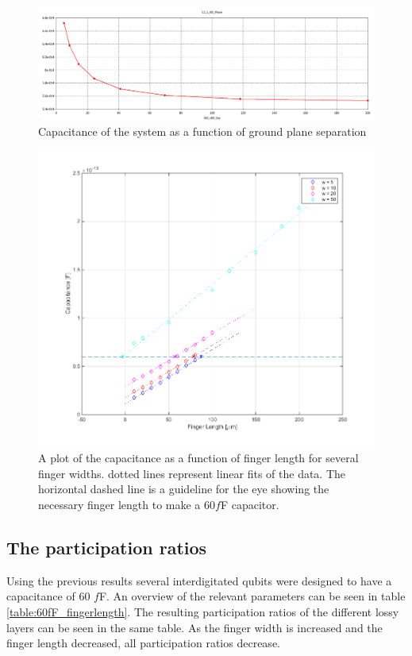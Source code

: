  

\begin{figure}
	\centering
	\includegraphics[width = \textwidth]{Figures/capacitance_vs_slotsize}
	\caption{Capacitance of the system as a function of ground plane separation}
	\label{fig:capacitance_vs_slotsize}
\end{figure}

\begin{figure}
	\centering
	\includegraphics[width = \textwidth]{Figures/Capacitances_g5_50}
	\caption{A plot of the capacitance as a function of finger length for several finger widths. dotted lines represent linear fits of the data. The horizontal dashed line is a guideline for the eye showing the necessary finger length to make a 60\(f\)F capacitor.}
	\label{fig:Capacitances_g5_50}
\end{figure}

\subsection{The participation ratios}
Using the previous results several interdigitated qubits were designed to have a capacitance of 60 \(f\)F. An overview of the relevant parameters can be seen in table \ref{table:60fF_fingerlength}. The resulting participation ratios of the different lossy layers can be seen in the same table. As the finger width is increased and the finger length decreased, all participation ratios decrease. 

